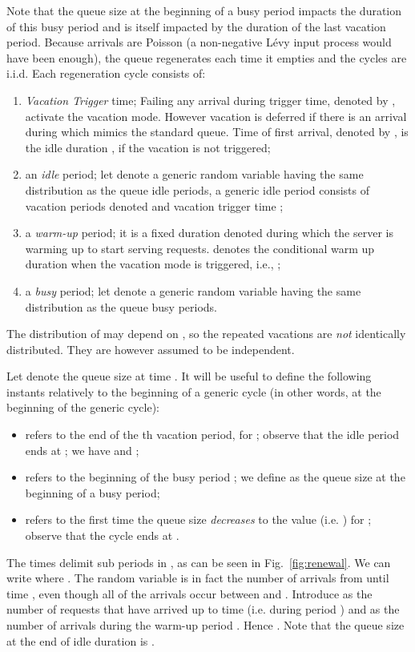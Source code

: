 \documentclass[journal]{IEEEtran}
\begin{document}
Note that the queue size at the beginning of a busy period impacts the duration of this busy period and is itself impacted by the duration of the last vacation period. Because arrivals are Poisson (a non-negative
L\'{e}vy input process would have been enough), the queue regenerates each time it empties and the cycles are i.i.d. Each regeneration cycle consists of:
\begin{enumerate}
\item {\em Vacation Trigger } time; Failing any arrival during trigger time, denoted by , activate the vacation mode. However vacation is deferred if there is an arrival during  which mimics the standard  queue. Time of first arrival, denoted by , is the idle duration , if the vacation is not triggered;
\item an {\em idle} period; let  denote a generic random variable having
the same distribution as the queue idle periods, a generic idle
period  consists of  vacation periods denoted  and vacation trigger time ;
\item a {\em warm-up} period; it is a fixed duration denoted  during which the server is warming up to start serving requests.  denotes the conditional warm up duration when the vacation mode is triggered, i.e., ;
\item a {\em busy} period; let  denote a generic random variable having
the same distribution as the queue busy periods. 
\end{enumerate}
The distribution of  may depend on , so the repeated vacations are {\em not} identically distributed. They are however assumed to be independent.

Let  denote the queue size at time . It will be useful to define the following instants relatively to the beginning of a generic cycle (in other words,  at the beginning of the generic cycle):
\begin{itemize} 
\item  refers to the end of the th vacation period, for ; observe that the idle period ends at ; we have  and ; \item  refers to the beginning of the busy period ; we define
 as the queue size at the beginning of a busy period; 
\item  refers to the first time the queue size {\em decreases} to the value  (i.e. ) for ; observe that the cycle ends at .
\end{itemize}
The times  delimit  sub periods in , as can be seen in Fig.~\ref{fig:renewal}. We can write  where .
The random variable  is in fact the number of arrivals from  until time , even though all of the arrivals occur between  and . Introduce  as the number of requests that have arrived up to time  (i.e. during period ) and  as the number of arrivals during the warm-up period . Hence . Note that the queue size at the end of idle duration is . 
\end{document}
